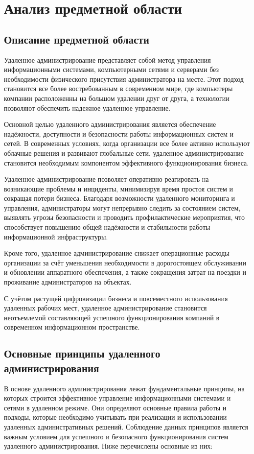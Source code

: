 \newsection
\section{Анализ предметной области}
\subsection{Описание предметной области}
Удаленное администрирование представляет собой метод управления информационными системами, компьютерными сетями и серверами без необходимости физического присутствия администратора на месте. Этот подход становится все более востребованным в современном мире, где компьютеры компании расположенны на большом удалении друг от друга, а технологии позволяют обеспечить надежное удаленное управление.

Основной целью удаленного администрирования является обеспечение надёжности, доступности и безопасности работы информационных систем и сетей. В современных условиях, когда организации все более активно используют облачные решения и развивают глобальные сети, удаленное администрирование становится необходимым компонентом эффективного функционирования бизнеса.

Удаленное администрирование позволяет оперативно реагировать на возникающие проблемы и инциденты, минимизируя время простоя систем и сокращая потери бизнеса. Благодаря возможности удаленного мониторинга и управления, администраторы могут непрерывно следить за состоянием систем, выявлять угрозы безопасности и проводить профилактические мероприятия, что способствует повышению общей надёжности и стабильности работы информационной инфраструктуры.

Кроме того, удаленное администрирование снижает операционные расходы организации за счёт уменьшения необходимости в дорогостоящем обслуживании и обновлении аппаратного обеспечения, а также сокращения затрат на поездки и проживание администраторов на объектах.

С учётом растущей цифровизации бизнеса и повсеместного использования удаленных рабочих мест, удаленное администрирование становится неотъемлемой составляющей успешного функционирования компаний в современном информационном пространстве.

\subsection{Основные принципы удаленного администрирования}

В основе удаленного администрирования лежат фундаментальные принципы, на которых строится эффективное управление информационными системами и сетями в удаленном режиме. Они определяют основные правила работы и подходы, которые необходимо учитывать при реализации и использовании удаленных административных решений. Соблюдение данных принципов является важным условием для успешного и безопасного функционирования систем удаленного администрирования. Ниже перечислены основные из них:

